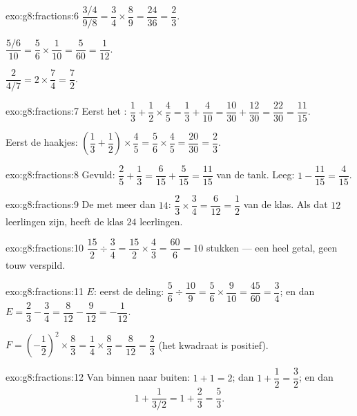 \begin{solution}{exo:g8:fractions:6}
$\dfrac{3/4}{9/8} = \dfrac34 \times \dfrac89 = \dfrac{24}{36} = \dfrac23$.

$\dfrac{5/6}{10} = \dfrac56 \times \dfrac{1}{10} = \dfrac{5}{60} = \dfrac{1}{12}$.

$\dfrac{2}{4/7} = 2 \times \dfrac74 = \dfrac72$.
\end{solution}

\begin{solution}{exo:g8:fractions:7}
Eerst het :
$\dfrac13 + \dfrac12 \times \dfrac45 = \dfrac13 + \dfrac{4}{10} = \dfrac{10}{30} +
\dfrac{12}{30} = \dfrac{22}{30} = \dfrac{11}{15}$.

Eerst de haakjes:
$\left(\dfrac13 + \dfrac12\right) \times \dfrac45 = \dfrac56 \times \dfrac45 =
\dfrac{20}{30} = \dfrac23$.
\end{solution}

\begin{solution}{exo:g8:fractions:8}
Gevuld: $\dfrac25 + \dfrac13 = \dfrac{6}{15} + \dfrac{5}{15} = \dfrac{11}{15}$ van de
tank. Leeg: $1 - \dfrac{11}{15} = \dfrac{4}{15}$.
\end{solution}

\begin{solution}{exo:g8:fractions:9}
De  met meer dan $14$: $\dfrac23 \times \dfrac34 = \dfrac{6}{12} = \dfrac12$ van
de klas. Als dat $12$ leerlingen zijn, heeft de klas $24$ leerlingen.
\end{solution}

\begin{solution}{exo:g8:fractions:10}
$\dfrac{15}{2} \div \dfrac34 = \dfrac{15}{2} \times \dfrac43 = \dfrac{60}{6} = 10$
stukken --- een heel getal, geen touw verspild.
\end{solution}

\begin{solution}{exo:g8:fractions:11}
$E$: eerst de deling:
$\dfrac56 \div \dfrac{10}{9} = \dfrac56 \times \dfrac{9}{10} = \dfrac{45}{60} =
\dfrac34$; en dan
$E = \dfrac23 - \dfrac34 = \dfrac{8}{12} - \dfrac{9}{12} = -\dfrac{1}{12}$.

$F = \left(-\dfrac12\right)^2 \times \dfrac83 = \dfrac14 \times \dfrac83 =
\dfrac{8}{12} = \dfrac23$ (het kwadraat is positief).
\end{solution}

\begin{solution}{exo:g8:fractions:12}
Van binnen naar buiten: $1 + 1 = 2$; dan $1 + \dfrac12 = \dfrac32$; en dan
\[
1 + \frac{1}{3/2} = 1 + \frac23 = \frac53 .
\]
\end{solution}

